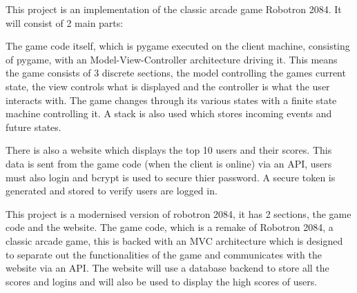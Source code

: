 This project is an implementation of the classic arcade game Robotron 2084. It will consist of 2 main parts:


The game code itself, which is pygame executed on the client machine, consisting of pygame, with an Model-View-Controller architecture driving it. This means the game consists of 3 discrete sections, the model controlling the games current state, the view controls what is displayed and the controller is what the user interacts with. The game changes through its various states with a finite state machine controlling it. A stack is also used which stores incoming events and future states.


There is also a website which displays the top 10 users and their scores. This data is sent from the game code (when the client is online) via an API, users must also login and bcrypt is used to secure thier password. A secure token is generated and stored to verify users are logged in.



This project is a modernised version of robotron 2084, it has 2 sections, the game code and the website. The game code, which is a remake of Robotron 2084, a classic arcade game, this is backed with an MVC architecture which is designed to separate out the functionalities of the game and communicates with the website via an API. The website will use a database backend to store all the scores and logins and will also be used to display the high scores of users.